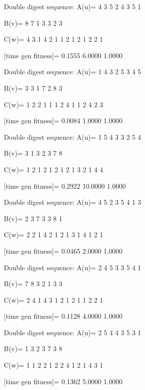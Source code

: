 Double digest sequence:
A(u)=
     4     3     5     2     4     3     5     1

B(v)=
     8     7     1     3     3     2     3

C(w)=
     4     3     1     4     2     1     1     2     1     2     1     2     2     1

[time gen fitness]=
    0.1555    6.0000    1.0000

Double digest sequence:
A(u)=
     1     4     3     2     5     3     4     5

B(v)=
     3     3     1     7     2     8     3

C(w)=
     1     2     2     1     1     1     2     4     1     1     2     4     2     3

[time gen fitness]=
    0.0084    1.0000    1.0000

Double digest sequence:
A(u)=
     1     5     4     3     3     2     5     4

B(v)=
     3     1     3     2     3     7     8

C(w)=
     1     2     1     2     1     2     1     2     1     3     2     1     4     4

[time gen fitness]=
    0.2922   10.0000    1.0000

Double digest sequence:
A(u)=
     4     5     2     3     5     4     1     3

B(v)=
     2     3     7     3     3     8     1

C(w)=
     2     2     1     4     2     1     2     1     3     1     4     1     2     1

[time gen fitness]=
    0.0465    2.0000    1.0000

Double digest sequence:
A(u)=
     2     4     5     3     3     5     4     1

B(v)=
     7     8     3     2     1     3     3

C(w)=
     2     4     1     4     3     1     2     1     2     1     1     2     2     1

[time gen fitness]=
    0.1128    4.0000    1.0000

Double digest sequence:
A(u)=
     2     5     4     4     3     5     3     1

B(v)=
     1     3     2     3     7     3     8

C(w)=
     1     1     2     2     1     2     2     4     1     2     1     4     3     1

[time gen fitness]=
    0.1362    5.0000    1.0000

